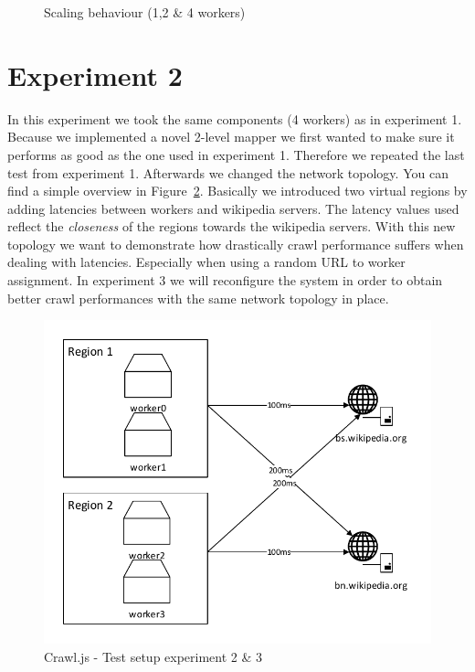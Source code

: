 \newline
\newline
\begin{figure}
\centering
\caption{Scaling behaviour (1,2 \& 4 workers)}
\label{plot:exp_001}
\end{figure}

\section{Experiment 2}

In this experiment we took the same components (4 workers) as in experiment 1. Because we implemented a novel 2-level mapper we first wanted to make sure it performs as good as the one used in experiment 1. Therefore we repeated the last test from experiment 1. Afterwards we changed the network topology. You can find a simple overview in Figure~\ref{test_setup2}. Basically we introduced two virtual regions by adding latencies between workers and wikipedia servers. The latency values used reflect the \emph{closeness} of the regions towards the wikipedia servers. With this new topology we want to demonstrate how drastically crawl performance suffers when dealing with latencies. Especially when using a random URL to worker assignment. In experiment 3 we will reconfigure the system in order to obtain better crawl performances with the same network topology in place.

\begin{figure}[h]
\centering
  \includegraphics[width=1.0\textwidth]{Figures/test_setup2.pdf}
  \caption{Crawl.js - Test setup experiment 2 \& 3}
\label{test_setup2}
\end{figure}

